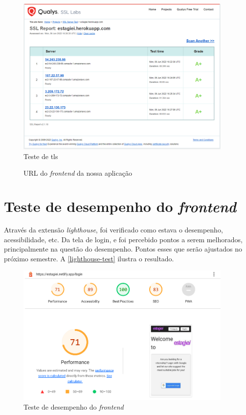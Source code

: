 \begin{figure}[H]
	\centering
	\caption{\label{grade-server-test}Teste de \ac{tls}}
	\includegraphics[width=0.95\textwidth]{../imagens/web-tests/grade-server-test.png}
\end{figure}

\begin{figure}[htb]
	\caption{\label{qr-url-frontend}URL do \textit{\gls{frontend}} da nossa aplicação}
	\begin{center}
	\end{center}
\end{figure}

\section{Teste de desempenho do \textit{\gls{frontend}}}
Através da extensão \textit{\gls{lighthouse}}, foi verificado como estava o desempenho, acessibilidade, etc. Da tela de login, e foi percebido pontos a serem melhorados, principalmente na questão do desempenho. Pontos esses que serão ajustados no próximo semestre. A \autoref{lighthouse-test} ilustra o resultado.

\begin{figure}[H]
	\centering
	\caption{\label{lighthouse-test}Teste de desempenho do \textit{\gls{frontend}}}
	\includegraphics[width=0.95\textwidth]{../imagens/web-tests/lighthouse-test.png}
\end{figure}


